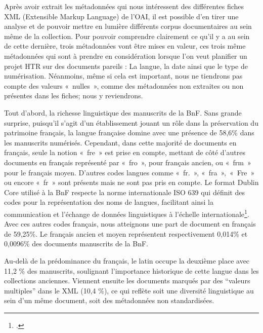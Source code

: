 \documentclass[a4paper,12pt,twoside]{book}
\begin{document}
	Après avoir extrait les métadonnées qui nous intéressent des différentes fiches XML (Extensible Markup Language) de l’OAI, il est possible d’en tirer une analyse et de pouvoir mettre en lumière différents corpus documentaires au sein même de la collection. Pour pouvoir comprendre clairement ce qu’il y a au sein de cette dernière, trois métadonnées vont être mises en valeur, ces trois même métadonnées qui sont à prendre en considération lorsque l’on veut planifier un projet HTR sur des documents pareils : La langue, la date ainsi que le type de numérisation. Néanmoins, même si cela est important, nous ne tiendrons pas compte des valeurs « nulles », comme des métadonnées non extraites ou non présentes dans les fiches; nous y reviendrons. 
	
	Tout d’abord, la richesse linguistique des manuscrits de la BnF. Sans grande surprise, puisqu’il s’agit d’un établissement jouant un rôle dans la préservation du patrimoine français, la langue française domine avec une présence de 58,6\% dans les manuscrits numérisés. Cependant, dans cette majorité de documents en français, seule la notion « fre » est prise en compte, mettant de côté d’autres documents en français représenté par « fro », pour français ancien, ou « frm » pour le français moyen. D’autres codes langues comme « fr. », « fra », « Fre » ou encore « fr » sont présents mais ne sont pas pris en compte. Le format Dublin Core utilisé à la BnF respecte la norme internationale ISO 639 qui définit des codes pour la représentation des noms de langues, facilitant ainsi la communication et l’échange de données linguistiques à l’échelle internationale\footcite{byrum_iso_1999}. Avec ces autres codes français, nous atteignons une part de document en français de 59,25\%. Le français ancien et moyen représentent respectivement 0,014\% et 0,0096\% des documents manuscrits de la BnF. 
	
	Au-delà de la prédominance du français, le latin occupe la deuxième place avec 11,2 \% des manuscrits, soulignant l’importance historique de cette langue dans les collections anciennes. Viennent ensuite les documents marqués par des “valeurs multiples” dans le XML (10,4 \%), ce qui reflète soit une diversité linguistique au sein d’un même document, soit des métadonnées non standardisées.
	
\end{document}
